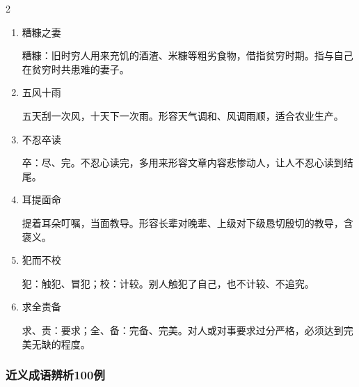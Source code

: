 \documentclass[final,oneside]{ctexbook}
\begin{document}
\begin{multicols}{2}
\begin{enumerate}
      曾：曾经；几何：多少。指时间过去没有多久，隐含 "不久之前" 的限定含义。

    \item 糟糠之妻

      糟糠：旧时穷人用来充饥的酒渣、米糠等粗劣食物，借指贫穷时期。指与自己在贫穷时共患难的妻子。

    \item 五风十雨

      五天刮一次风，十天下一次雨。形容天气调和、风调雨顺，适合农业生产。

    \item 不忍卒读

      卒：尽、完。不忍心读完，多用来形容文章内容悲惨动人，让人不忍心读到结尾。

    \item 耳提面命

      提着耳朵叮嘱，当面教导。形容长辈对晚辈、上级对下级恳切殷切的教导，含褒义。

    \item 犯而不校

      犯：触犯、冒犯；校：计较。别人触犯了自己，也不计较、不追究。

    \item 求全责备

      求、责：要求；全、备：完备、完美。对人或对事要求过分严格，必须达到完美无缺的程度。

  \end{enumerate}
\end{multicols}

\subsubsection{近义成语辨析100例}
\end{document}
